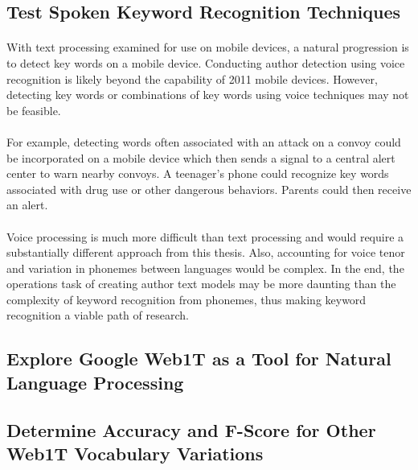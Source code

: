 \subsection{Test Spoken Keyword Recognition Techniques} 
\paragraph*{}With text processing examined for use on mobile devices, a natural progression is to detect key words on a mobile device.  Conducting author detection using voice recognition is likely beyond the capability of 2011 mobile devices. However, detecting key words or combinations of key words using voice techniques may not be feasible.
\paragraph*{} For example, detecting words often associated with an attack on a convoy could be incorporated on a mobile device which then sends a signal to a central alert center to warn nearby convoys.  A teenager's phone could recognize key words associated with drug use or other dangerous behaviors.  Parents could then receive an alert.
\paragraph*{} Voice processing is much more difficult than text processing and would require a substantially different approach from this thesis.  Also, accounting for voice tenor and variation in phonemes between languages would be complex. In the end, the operations task of creating author text models may be more daunting than the complexity of keyword recognition from phonemes, thus making keyword recognition a viable path of research.




\begin{singlespace}
\section{Explore Google Web1T as a Tool for Natural Language Processing}
\end{singlespace}

	\begin{singlespace}
	\subsection{Determine Accuracy and F-Score for Other Web1T Vocabulary Variations}
	\end{singlespace}
